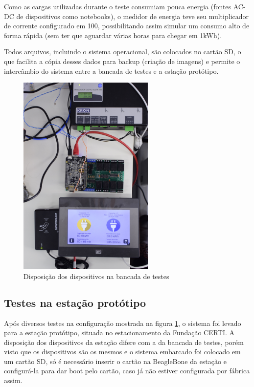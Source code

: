       Como as cargas utilizadas durante o teste consumiam pouca energia (fontes AC-DC de dispositivos como notebooks), o medidor de energia teve seu multiplicador de corrente configurado em 100, possibilitando assim simular um consumo alto de forma rápida (sem ter que aguardar várias horas para chegar em 1kWh).

      Todos arquivos, incluindo o sistema operacional, são colocados no cartão SD, o que facilita a cópia desses dados para backup (criação de imagens) e permite o intercâmbio do sistema entre a bancada de testes e a estação protótipo.

      \begin{figure}[H]
        \begin{center}
          \includegraphics[width=0.6\textwidth,natwidth=2130,natheight=1420,angle=-90]{assets/images/prototype-setup.jpg}
          \caption{Disposição dos dispositivos na bancada de testes}
          \label{fig:prototype-setup}
        \end{center}
      \end{figure}

    \subsection{Testes na estação protótipo}

      Após diversos testes na configuração mostrada na figura \ref{fig:prototype-setup}, o sistema foi levado para a estação protótipo, situada no estacionamento da Fundação CERTI. A disposição dos dispositivos da estação difere com a da bancada de testes, porém visto que os dispositivos são os mesmos e o sistema embarcado foi colocado em um cartão SD, só é necessário inserir o cartão na BeagleBone da estação e configurá-la para dar boot pelo cartão, caso já não estiver configurada por fábrica assim.


